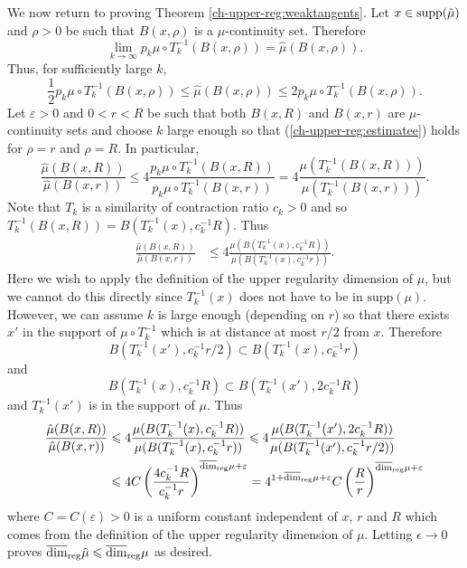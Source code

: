 We now return to proving Theorem \ref{ch-upper-reg:weaktangents}. Let  $x \in \textup{supp}( \hat \mu)$ and $\rho>0$ be such that $B(x,\rho)$ is a $\hat \mu$-continuity set.   Therefore 
\[
\lim_{k\rightarrow \infty} p_k \mu \circ T^{-1}_k (B(x,\rho)) =\hat{\mu}(B(x,\rho)).
\]
Thus, for sufficiently large $k$, 
\begin{equation} \label{ch-upper-reg:estimatee}
\frac{1}{2}p_k \mu \circ T^{-1}_k (B(x,\rho))  \le \hat{\mu}(B(x,\rho))\le 2p_k \mu \circ T^{-1}_k (B(x,\rho)).
\end{equation}
Let $\varepsilon > 0 $ and  $0<r<R$ be such that both $B(x,R)$ and $B(x,r)$ are $\hat \mu$-continuity sets  and  choose $k $ large enough so that  (\ref{ch-upper-reg:estimatee}) holds for $\rho=r$ and $\rho=R$.  In particular,  
\[
\frac{\hat{\mu}(B(x,R))}{\hat{\mu}(B(x,r))} \le 4 \frac{p_k\mu \circ T^{-1}_k (B(x,R))}{p_k \mu \circ T^{-1}_k (B(x,r))}=4\frac{\mu (T^{-1}_k (B(x,R)))}{\mu( T^{-1}_k (B(x,r)))}.
\]
Note that $T_k$ is a similarity of contraction ratio $c_k >0$ and so $T_k^{-1}(B(x,R))= B(T_k^{-1}(x),c_k^{-1}R)$. Thus
\begin{align*}
\frac{\hat{\mu}(B(x,R))}{\hat{\mu}(B(x,r))} &\le 4\frac{\mu (B(T_k^{-1}(x),c_k^{-1}R))}{\mu (B(T_k^{-1}(x),c_k^{-1}r))}.
\end{align*}
Here we wish to apply the definition of the upper regularity dimension of $\mu$, but we cannot do this directly since  $T_k^{-1}(x)$ does not have to be in $\text{supp}(\mu)$. However, we can assume $k$ is large enough (depending on $r$) so that there exists $x'$ in the support of $\mu \circ T_k^{-1}$ which is at distance at most $r/2$ from $x$. Therefore
\[
B(T_k^{-1}(x'),c_k^{-1}r/2)\subset B(T_k^{-1}(x),c_k^{-1}r)
\]
and
\[
B(T_k^{-1}(x),c_k^{-1}R) \subset B(T_k^{-1}(x'), 2c_k^{-1}R)
\]
and $T_k^{-1}(x')$ is in the support of $\mu$.  Thus
\begin{align*}
\frac{\hat{\mu}(B(x,R))}{\hat{\mu}(B(x,r))} &\leqslant 4\frac{\mu (B(T_k^{-1}(x),c_k^{-1}R))}{\mu (B(T_k^{-1}(x),c_k^{-1}r))} \leqslant 4\frac{\mu (B(T_k^{-1}(x'),2c_k^{-1}R))}{\mu (B(T_k^{-1}(x'),c_k^{-1}r/2))} \\
&\leqslant 4C \left(\frac{4c_k^{-1}R}{c_k^{-1}r}\right)^{\overline{\dim}_{\textup{reg}} \mu+ \varepsilon} =  4^{1+\overline{\dim}_{\textup{reg}} \mu+ \varepsilon}C \left(\frac{R}{r}\right)^{\overline{\dim}_{\textup{reg}} \mu+ \varepsilon}
\end{align*}
where $C= C(\varepsilon)>0$ is a uniform constant independent of $x$, $r$ and $R$ which comes from the definition of the upper regularity dimension of $\mu$. Letting $\epsilon \to 0$ proves  $\overline{\dim}_{\textup{reg}} \hat{\mu} \leqslant \overline{\dim}_{\textup{reg}} \mu$ as desired.

